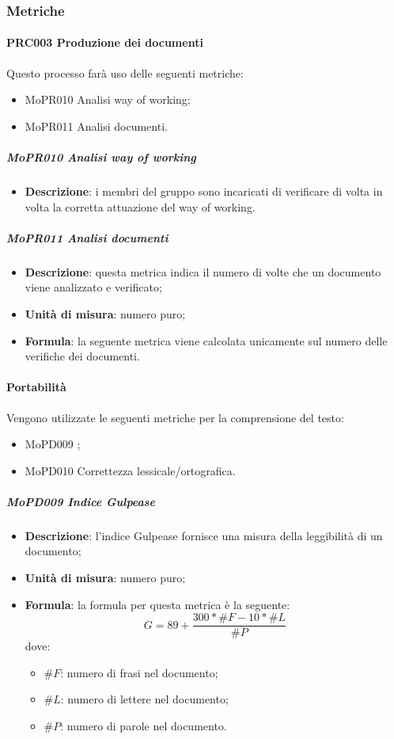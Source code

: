 \documentclass[../norme-di-progetto.tex]{subfiles}
\begin{document}
\subsubsection{Metriche}
\paragraph{PRC003 Produzione dei documenti}
Questo processo farà uso delle seguenti metriche:
\begin{itemize}
  \item MoPR010 Analisi way of working;
  \item MoPR011 Analisi documenti.
\end{itemize}
\subparagraph{MoPR010 Analisi way of working}
\begin{itemize}
  \item \textbf{Descrizione}: i membri del gruppo sono incaricati di verificare di volta in volta la corretta attuazione del way of working.
\end{itemize}

\subparagraph{MoPR011 Analisi documenti}
\begin{itemize}
  \item \textbf{Descrizione}: questa metrica indica il numero di volte che un documento viene analizzato e verificato;
  \item \textbf{Unità di misura}: numero puro;
  \item \textbf{Formula}: la seguente metrica viene calcolata unicamente sul numero delle verifiche dei documenti.
\end{itemize}

\paragraph{Portabilità}
Vengono utilizzate le seguenti metriche per la comprensione del testo:
\begin{itemize}
  \item MoPD009 ;
  \item MoPD010 Correttezza lessicale/ortografica.
\end{itemize}
\subparagraph{MoPD009 Indice Gulpease}
\begin{itemize}
  \item \textbf{Descrizione}: l'indice Gulpease fornisce una misura della leggibilità di un documento;
  \item \textbf{Unità di misura}: numero puro;
  \item \textbf{Formula}: la formula per questa metrica è la seguente:
  \begin{displaymath}
    G=89+\frac{300*\#F - 10*\#L}{\#P}
  \end{displaymath}
  dove:
  \begin{itemize}
    \item $ \#F $: numero di frasi nel documento;
    \item $ \#L $: numero di lettere nel documento;
    \item $ \#P $: numero di parole nel documento.
  \end{itemize}
\end{itemize}
\end{document}
